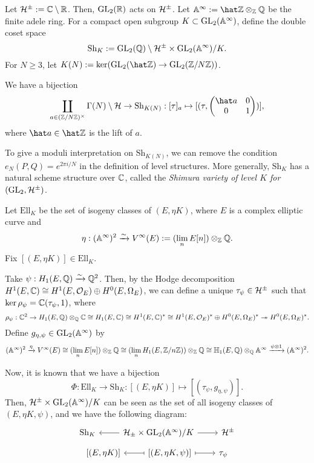 \documentclass{../../../small}
\newcommand{\Ell}{\mathrm{Ell}}
\newcommand{\Sh}{\mathrm{Sh}}
\begin{document}
Let $\mathcal{H}^\pm:=\mathbb{C}\setminus\mathbb{R}$.
Then, $\mathrm{GL}_2(\mathbb{R})$ acts on $\mathcal{H}^\pm$.
Let $\A^\infty:=\hat\Z\otimes_\Z\Q$ be the finite adele ring.
For a compact open subgroup $K\subset\mathrm{GL}_2(\mathbb{A}^\infty)$, define the double coset space
\[\Sh_K:=\GL_2(\Q)\setminus\cH^\pm\times\GL_2(\A^\infty)/K.\]
For $N\ge3$, let $K(N):=\ker(\GL_2(\hat\Z)\to\GL_2(\Z/N\Z))$.
\begin{prop*}
We have a bijection
\[\coprod_{a\in(\Z/N\Z)^\times}\Gamma(N)\setminus\cH\to\Sh_{K(N)}:[\tau]_a\mapsto[(\tau,\mat{\hat a&0\\0&1})],\]
where $\hat a\in\hat\Z$ is the lift of $a$.
\end{prop*}
\begin{rmk*}
To give a moduli interpretation on $\Sh_{K(N)}$, we can remove the condition $e_N(P,Q)=e^{2\pi i/N}$ in the definition of level structures.
More generally, $\Sh_K$ has a natural scheme structure over $\mathbb{C}$, called the \emph{Shimura variety of level $K$ for $(\mathrm{GL}_2,\mathcal{H}^\pm)$}.
\end{rmk*}



Let $\Ell_K$ be the set of isogeny classes of $(E,\eta K)$, where $E$ is a complex elliptic curve and
\[\eta:(\mathbb{A}^\infty)^2\xrightarrow{\sim}V^\infty(E):=(\lim_nE[n])\otimes_{\mathbb{Z}}\mathbb{Q}.\]
Fix $[(E,\eta K)]\in\Ell_K$.

Take $\psi:H_1(E,\mathbb{Q})\xrightarrow{\sim}\mathbb{Q}^2$.
Then, by the Hodge decomposition $H^1(E,\mathbb{C})\cong H^1(E,\mathcal{O}_E)\oplus H^0(E,\Omega_E)$, we can define a unique $\tau_\psi\in\mathcal{H}^\pm$ such that $\ker\rho_\psi=\mathbb{C}(\tau_\psi,1)$, where
\[\rho_\psi:\mathbb{C}^2\to H_1(E,\mathbb{Q})\otimes_{\mathbb{Q}}\mathbb{C}\cong H_1(E,\mathbb{C})\cong H^1(E,\mathbb{C})^*\cong H^1(E,\mathcal{O}_E)^*\oplus H^0(E,\Omega_E)^*\twoheadrightarrow H^0(E,\Omega_E)^*.\]
Define $g_{\eta,\psi}\in\mathrm{GL}_2(\mathbb{A}^\infty)$ by
\[(\mathbb{A}^\infty)^2\xrightarrow{\eta}V^\infty(E)\cong(\lim_nE[n])\otimes_{\mathbb{Z}}\mathbb{Q}\cong(\lim_nH_1(E,\mathbb{Z}/n\mathbb{Z}))\otimes_{\mathbb{Z}}\mathbb{Q}\cong\mathbb{H}_1(E,\mathbb{Q})\otimes_{\mathbb{Q}}\mathbb{A}^\infty\xrightarrow{\psi\otimes1}(\mathbb{A}^\infty)^2.\]

Now, it is known that we have a bijection
\[\Phi:\Ell_K\to\Sh_K:[(E,\eta K)]\mapsto[(\tau_\psi,g_{\eta,\psi})].\]
Then, $\mathcal{H}^\pm\times\mathrm{GL}_2(\mathbb{A}^\infty)/K$ can be seen as the set of all isogeny classes of $(E,\eta K,\psi)$, and we have the following diagram:
\[\begin{tikzcd}
\Sh_K&\cH_\pm\times\GL_2(\A^\infty)/K\rar\lar&\cH^\pm
\end{tikzcd}\]
\[\begin{tikzcd}
\left[(E,\eta K)\right]&\left[(E,\eta K,\psi)\right]\ar[mapsto]{r}\ar[mapsto]{l}&\tau_\psi
\end{tikzcd}\]
\end{document}
